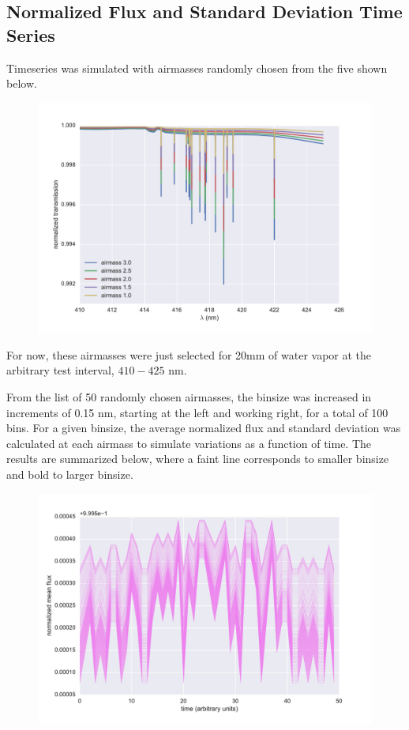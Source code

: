 \documentclass[a4paper]{article}
\begin{document}
\subsection*{Normalized Flux and Standard Deviation Time Series}
Timeseries was simulated with airmasses randomly chosen from the five shown below.
\begin{figure}[H]
  \centering
  \includegraphics[width=0.75\paperwidth]{./Figures/spectra_stack}
\end{figure}

For now, these airmasses were just selected for 20mm of water vapor at the arbitrary test interval, $410-425$
nm. 

From the list of 50 randomly chosen airmasses, the binsize was increased in increments of 0.15 nm, starting at
the left and working right, for a total of 100 bins. For a given binsize, the average normalized flux and
standard deviation was calculated at each airmass to simulate variations as a function of time.
The results are summarized below, where a faint line corresponds to smaller binsize and bold to larger binsize.
\begin{figure}[H]
  \centering
  \includegraphics[width=0.75\paperwidth]{./Figures/meanflux_timeseries}
\end{figure}
\end{document}

